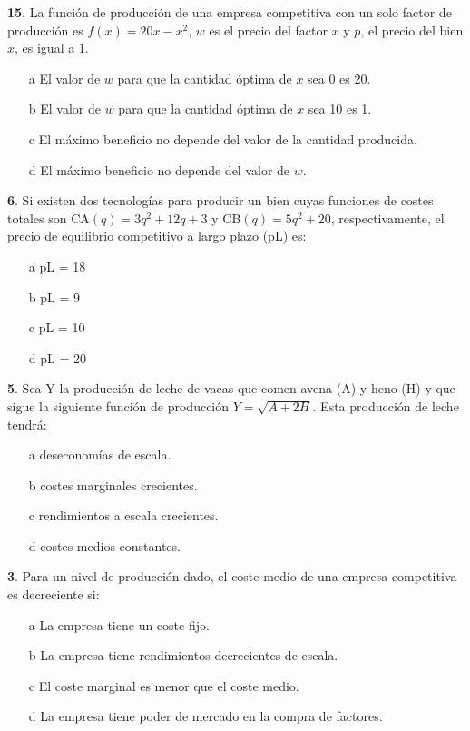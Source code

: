 \documentclass{nuevotema}
\begin{document}
\textbf{15}. La función de producción de una empresa competitiva con un solo factor de producción es $f(x) = 20x - x^2$, $w$ es el precio del factor $x$ y $p$, el precio del bien $x$, es igual a 1.

\begin{enumerate}
	\item[a] El valor de $w$ para que la cantidad óptima de $x$ sea 0 es 20.
	\item[b] El valor de $w$ para que la cantidad óptima de $x$ sea 10 es 1.
	\item[c] El máximo beneficio no depende del valor de la cantidad producida.
	\item[d] El máximo beneficio no depende del valor de $w$.
\end{enumerate}

\textbf{6}. Si existen dos tecnologías para producir un bien cuyas funciones de costes totales son $\text{CA}(q) = 3q^2 + 12q +3$ y $\text{CB}(q)=5q^2 + 20$, respectivamente, el precio de equilibrio competitivo a largo plazo (pL) es:

\begin{enumerate}
	\item[a] pL = 18
	\item[b] pL = 9
	\item[c] pL = 10
	\item[d] pL = 20
\end{enumerate}


\textbf{5}. Sea Y la producción de leche de vacas que comen avena (A) y heno (H) y que sigue la siguiente función de producción $Y = \sqrt{A+2H}$. Esta producción de leche tendrá:

\begin{enumerate}
	\item[a] deseconomías de escala.
	\item[b] costes marginales crecientes.
	\item[c] rendimientos a escala crecientes.
	\item[d] costes medios constantes.
\end{enumerate}


\textbf{3}. Para un nivel de producción dado, el coste medio de una empresa competitiva es decreciente si:

\begin{enumerate}
	\item[a] La empresa tiene un coste fijo.
	\item[b] La empresa tiene rendimientos decrecientes de escala.
	\item[c] El coste marginal es menor que el coste medio.
	\item[d] La empresa tiene poder de mercado en la compra de factores.
\end{enumerate}
\end{document}
